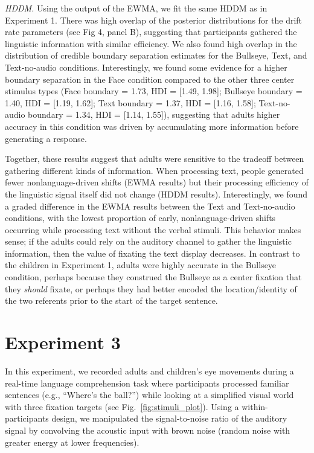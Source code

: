 \documentclass[english,floatsintext,man]{apa6}
\theoremstyle{definition}
\theoremstyle{definition}
\theoremstyle{definition}
\theoremstyle{remark}
\begin{document}
\emph{HDDM.} Using the output of the EWMA, we fit the same HDDM as in
Experiment 1. There was high overlap of the posterior distributions for
the drift rate parameters (see Fig 4, panel B), suggesting that
participants gathered the linguistic information with similar
efficiency. We also found high overlap in the distribution of credible
boundary separation estimates for the Bullseye, Text, and Text-no-audio
conditions. Interestingly, we found some evidence for a higher boundary
separation in the Face condition compared to the other three center
stimulus types (Face boundary = 1.73, HDI = {[}1.49, 1.98{]}; Bullseye
boundary = 1.40, HDI = {[}1.19, 1.62{]}; Text boundary = 1.37, HDI =
{[}1.16, 1.58{]}; Text-no-audio boundary = 1.34, HDI = {[}1.14,
1.55{]}), suggesting that adults higher accuracy in this condition was
driven by accumulating more information before generating a response.

Together, these results suggest that adults were sensitive to the
tradeoff between gathering different kinds of information. When
processing text, people generated fewer nonlanguage-driven shifts (EWMA
results) but their processing efficiency of the linguistic signal itself
did not change (HDDM results). Interestingly, we found a graded
difference in the EWMA results between the Text and Text-no-audio
conditions, with the lowest proportion of early, nonlanguage-driven
shifts occurring while processing text without the verbal stimuli. This
behavior makes sense; if the adults could rely on the auditory channel
to gather the linguistic information, then the value of fixating the
text display decreases. In contrast to the children in Experiment 1,
adults were highly accurate in the Bullseye condition, perhaps because
they construed the Bullseye as a center fixation that they \emph{should}
fixate, or perhaps they had better encoded the location/identity of the
two referents prior to the start of the target sentence.

\hypertarget{experiment-3}{%
\section{Experiment 3}\label{experiment-3}}

In this experiment, we recorded adults and children's eye movements
during a real-time language comprehension task where participants
processed familiar sentences (e.g., \enquote{Where's the ball?}) while
looking at a simplified visual world with three fixation targets (see
Fig.~\ref{fig:stimuli_plot}). Using a within-participants design, we
manipulated the signal-to-noise ratio of the auditory signal by
convolving the acoustic input with brown noise (random noise with
greater energy at lower frequencies).
\end{document}
